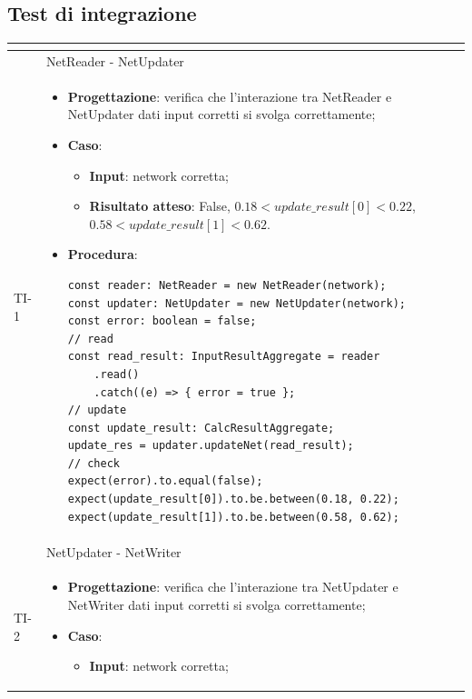 \subsection{Test di integrazione}
\normalsize
\renewcommand{\arraystretch}{1}
\begin{longtable}{|C{2.5cm}|C{13cm}|}
	\hline
	\textbf{\color{title_text}{Test}} & \textbf{\color{title_text}{Specifica}}  \\
	\endhead
	\hline
	 & NetReader - NetUpdater\\
	\hline
	{TI-1} &
	\begin{itemize}
		\item \textbf{Progettazione}: verifica che l'interazione tra NetReader e NetUpdater dati input corretti si svolga correttamente;
		\item \textbf{Caso}: 
		\begin{itemize}
			\item \textbf{Input}: network corretta;
			\item \textbf{Risultato atteso}: False, \newline $0.18 < update\_result[0] < 0.22$, \newline $0.58 < update\_result[1] < 0.62$.
		\end{itemize}
		\item \textbf{Procedura}:
		\begin{lstlisting}
const reader: NetReader = new NetReader(network);
const updater: NetUpdater = new NetUpdater(network);
const error: boolean = false;
// read
const read_result: InputResultAggregate = reader
	.read()
	.catch((e) => { error = true };
// update
const update_result: CalcResultAggregate;
update_res = updater.updateNet(read_result);
// check
expect(error).to.equal(false); 
expect(update_result[0]).to.be.between(0.18, 0.22);
expect(update_result[1]).to.be.between(0.58, 0.62);
		\end{lstlisting}
	\end{itemize} \\ 
	\hline \newpage	\hline
	 &  NetUpdater - NetWriter\\
	\hline	
	{TI-2} &
	\begin{itemize}
		\item \textbf{Progettazione}: verifica che l'interazione tra NetUpdater e NetWriter dati input corretti si svolga correttamente;
		\item \textbf{Caso}: 
		\begin{itemize}
			\item \textbf{Input}: network corretta;

\end{itemize}
\end{itemize}
\end{longtable}
